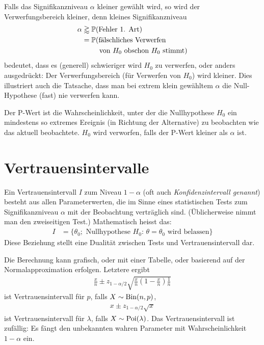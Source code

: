 Falls das Signifikanzniveau $\alpha$ kleiner gewählt wird, so wird der Verwerfungsbereich kleiner, denn kleines Signifikanzniveau
\begin{align*}
	\alpha&\gtrapprox \p(\text{Fehler 1. Art})\\
	&=\p(\text{fälschliches Verwerfen} \\
	&\hphantom{=\p()} \text{von $H_0$ obschon $H_0$ stimmt})
\end{align*}
bedeutet, dass es (generell) schwieriger wird $H_0$ zu verwerfen, oder anders ausgedrückt: Der Verwerfungsbereich (für Verwerfen von $H_0$) wird kleiner. Dies illustriert auch die Tatsache, dass man bei extrem klein gewähltem $\alpha$ die Null-Hypothese (fast) nie verwerfen kann.

Der P-Wert ist die Wahrscheinlichkeit, unter der die Nullhypothese $H_0$ ein mindestens so extremes Ereignis (in Richtung der Alternative) zu beobachten wie das aktuell beobachtete. $H_0$ wird verworfen, falls der P-Wert kleiner als $\alpha$ ist.
\section{Vertrauensintervalle}
Ein Vertrauensintervall $I$ zum Niveau $1-\alpha$ (oft auch \emph{Konfidenzintervall genannt}) besteht aus allen Parameterwerten, die im Sinne eines statistischen Tests zum Signifikanzniveau $\alpha$ mit der Beobachtung verträglich sind. (Üblicherweise nimmt man den zweiseitigen Test.) Mathematisch heisst das:
\begin{align*}
	I&=\{ \theta_0;\text{ Nullhypothese }H_0:\, \theta=\theta_0\text{ wird belassen} \}
\end{align*}
Diese Beziehung stellt eine Dualität zwischen Tests und Vertrauensintervall dar. 

Die Berechnung kann grafisch, oder mit einer Tabelle, oder basierend auf der Normalapproximation erfolgen. Letztere ergibt
\begin{gather*}
	\frac{x}{n}\pm z_{1-\alpha/2}\sqrt{\frac{x}{n}\left( 1-\frac{x}{n} \right)\frac{1}{n}}
\end{gather*}
ist Vertrauensintervall für $p$, falls $X\sim \operatorname{Bin}(n,p)$,
\begin{gather*}
	x\pm z_{1-\alpha/2}\sqrt{x}
\end{gather*}
ist Vertrauensintervall für $\lambda$, falls $X\sim \operatorname{Poi}(\lambda)$.
Das Vertrauensintervall ist zufällig: Es fängt den unbekannten wahren Parameter mit Wahrscheinlichkeit $1-\alpha$ ein.
